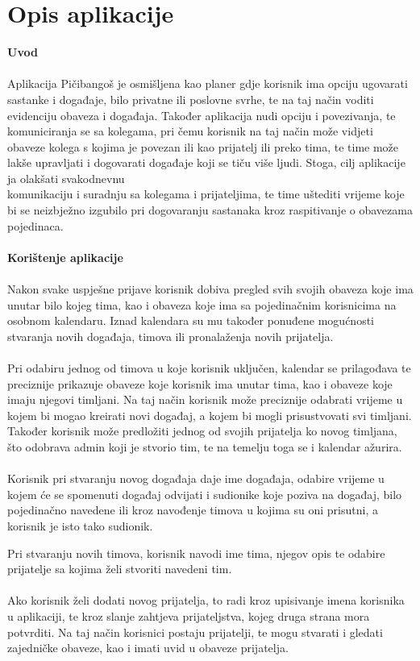 		\section{Opis aplikacije}

		\bigskip

		\noindent\textbf{Uvod}\\
		\\
		Aplikacija Pičibangoš je osmišljena kao planer gdje korisnik ima opciju ugovarati sastanke i događaje, bilo privatne ili poslovne svrhe, te na taj način voditi evidenciju obaveza i događaja. Također aplikacija nudi opciju i povezivanja, te komuniciranja se sa kolegama, pri čemu korisnik na taj način može vidjeti obaveze kolega s kojima je povezan ili kao prijatelj ili preko tima, te time može lakše upravljati i dogovarati događaje koji se tiču više ljudi. Stoga, cilj aplikacije ja olakšati svakodnevnu \\ komunikaciju i suradnju sa kolegama i prijateljima, te time uštediti vrijeme koje bi se neizbježno izgubilo pri dogovaranju sastanaka kroz raspitivanje o obavezama pojedinaca.  \\
		\\

		\noindent\textbf{Korištenje aplikacije}\\
		\\
		Nakon svake uspješne prijave korisnik dobiva pregled svih svojih obaveza koje ima unutar bilo kojeg tima, kao i obaveza koje ima sa pojedinačnim korisnicima na osobnom kalendaru. Iznad kalendara su mu također ponuđene mogućnosti stvaranja novih događaja, timova ili pronalaženja novih prijatelja.  \\
		\\
		Pri odabiru jednog od timova u koje korisnik uključen, kalendar se prilagođava te preciznije prikazuje obaveze koje korisnik ima unutar tima, kao i obaveze koje imaju njegovi timljani. Na taj način korisnik može preciznije odabrati vrijeme u kojem bi mogao kreirati novi događaj, a kojem bi mogli prisustvovati svi timljani. Također korisnik može predložiti jednog od svojih prijatelja ko novog timljana, što odobrava admin koji je stvorio tim, te na temelju toga se i kalendar ažurira.\\
		\\
		Korisnik pri stvaranju novog događaja daje ime događaja, odabire vrijeme u kojem će se spomenuti događaj odvijati i sudionike koje poziva na događaj, bilo pojedinačno navedene ili kroz navođenje timova u kojima su oni prisutni, a korisnik je isto tako sudionik. \\
		\pagebreak

		Pri stvaranju novih timova, korisnik navodi ime tima, njegov opis te odabire prijatelje sa kojima želi stvoriti navedeni tim.\\
		\\
		Ako korisnik želi dodati novog prijatelja, to radi kroz upisivanje imena korisnika u aplikaciji, te kroz slanje zahtjeva prijateljstva, kojeg druga strana mora potvrditi. Na taj način korisnici postaju prijatelji, te mogu stvarati i gledati zajedničke obaveze, kao i imati uvid u obaveze prijatelja.\\
		\pagebreak



		\eject
